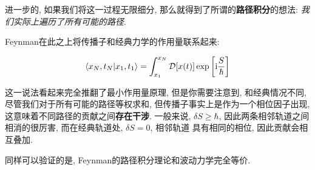 进一步的, 如果我们将这一过程无限细分, 那么就得到了所谓的{\bf 路径积分}的想法:
\emph{我们实际上遍历了所有可能的路径}.

Feynman在此之上将传播子和经典力学的作用量联系起来:

\begin{equation}
  \begin{aligned}
    \bra{x_{N}, t _{N}}\ket{x_1, t_1} = \int _{x_1}^{x_N} \mathcal{D}[x(t)] \exp \left[{\rm i} \frac{S}{\hbar}\right]
  \end{aligned}
\end{equation}

\begin{remark}
  这一说法看起来完全推翻了最小作用量原理, 但是你需要注意到, 和经典情况不同,
  尽管我们对于所有可能的路径等权求和, 但传播子事实上是作为一个相位因子出现,
  这意味着不同路径的贡献之间{\bf 存在干涉}. 一般来说, $\delta S\geq \hbar$,
  因此两条相邻轨道之间相消的很厉害, 而在经典轨道处, $\delta S=0$, 相邻轨道
  具有相同的相位, 因此贡献会相互叠加.
\end{remark}

同样可以验证的是, Feynman的路径积分理论和波动力学完全等价.
